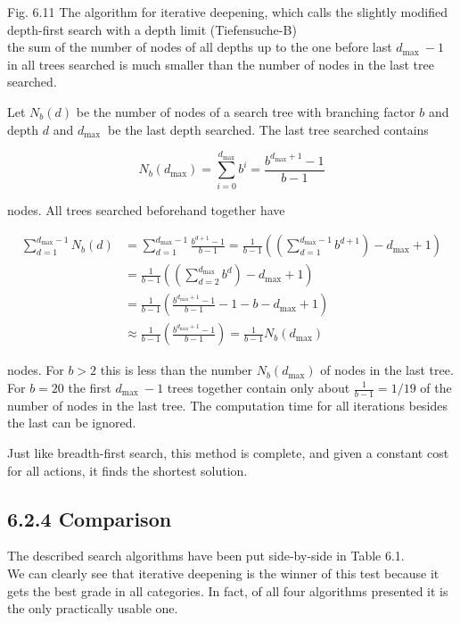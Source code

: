 \documentclass[10pt]{article}
\begin{document}
Fig. 6.11 The algorithm for iterative deepening, which calls the slightly modified depth-first search with a depth limit (Tiefensuche-B)\\
the sum of the number of nodes of all depths up to the one before last $d_{\text {max }}-1$ in all trees searched is much smaller than the number of nodes in the last tree searched.

Let $N_{b}(d)$ be the number of nodes of a search tree with branching factor $b$ and depth $d$ and $d_{\text {max }}$ be the last depth searched. The last tree searched contains

$$
N_{b}\left(d_{\max }\right)=\sum_{i=0}^{d_{\max }} b^{i}=\frac{b^{d_{\max }+1}-1}{b-1}
$$

nodes. All trees searched beforehand together have

$$
\begin{aligned}
\sum_{d=1}^{d_{\max }-1} N_{b}(d) & =\sum_{d=1}^{d_{\max }-1} \frac{b^{d+1}-1}{b-1}=\frac{1}{b-1}\left(\left(\sum_{d=1}^{d_{\max }-1} b^{d+1}\right)-d_{\max }+1\right) \\
& =\frac{1}{b-1}\left(\left(\sum_{d=2}^{d_{\max }} b^{d}\right)-d_{\max }+1\right) \\
& =\frac{1}{b-1}\left(\frac{b^{d_{\max }+1}-1}{b-1}-1-b-d_{\max }+1\right) \\
& \approx \frac{1}{b-1}\left(\frac{b^{d_{\max }+1}-1}{b-1}\right)=\frac{1}{b-1} N_{b}\left(d_{\max }\right)
\end{aligned}
$$

nodes. For $b>2$ this is less than the number $N_{b}\left(d_{\max }\right)$ of nodes in the last tree. For $b=20$ the first $d_{\text {max }}-1$ trees together contain only about $\frac{1}{b-1}=1 / 19$ of the number of nodes in the last tree. The computation time for all iterations besides the last can be ignored.

Just like breadth-first search, this method is complete, and given a constant cost for all actions, it finds the shortest solution.

\subsection*{6.2.4 Comparison}
The described search algorithms have been put side-by-side in Table 6.1.\\
We can clearly see that iterative deepening is the winner of this test because it gets the best grade in all categories. In fact, of all four algorithms presented it is the only practically usable one.
\end{document}
